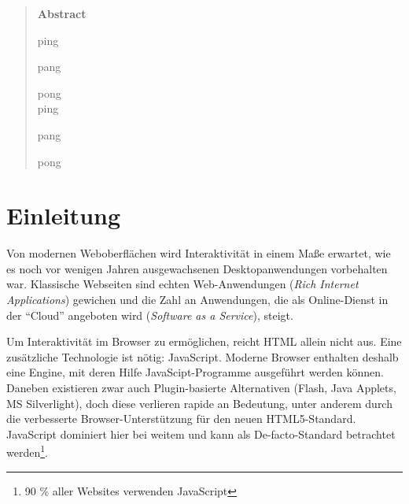 \documentclass[a4paper, 12pt, hidelinks, listof=totoc, listoftables=totoc, bibliography=totoc]{scrreprt}
\begin{document}


\pagestyle{empty} %


\begin{abstract}

\Large
	\textbf{Abstract}

\normalsize


ping

pang

pong \\


ping

pang

pong
\end{abstract}


\pagestyle{scrheadings} %



\tableofcontents

\newpage


\chapter{Einleitung}



Von modernen Weboberflächen wird Interaktivität in einem Maße erwartet, wie es noch vor wenigen Jahren ausgewachsenen Desktopanwendungen vorbehalten war. Klassische Webseiten sind echten Web-Anwendungen (\textit{Rich Internet Applications}) gewichen und die Zahl an Anwendungen, die als Online-Dienst in der "`Cloud"' angeboten wird (\textit{Software as a Service}), steigt.


Um Interaktivität im Browser zu ermöglichen, reicht HTML allein nicht aus. Eine zusätzliche Technologie ist nötig: JavaScript. Moderne Browser enthalten deshalb eine Engine, mit deren Hilfe JavaScipt-Programme ausgeführt werden können. Daneben existieren zwar auch Plugin-basierte Alternativen (Flash, Java Applets, MS Silverlight), doch diese verlieren rapide an Bedeutung, unter anderem durch die verbesserte Browser-Unterstützung für den neuen HTML5-Standard. JavaScript dominiert hier bei weitem und kann als De-facto-Standard betrachtet werden\footnote{90 \% aller Websites verwenden JavaScript\cite{w3techs.CLI}}.
\end{document}
